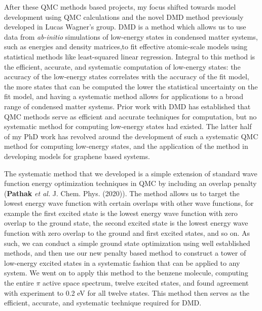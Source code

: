 \documentclass{article}
\begin{document}
After these QMC methods based projects, my focus shifted towards model development using QMC calculations and the novel DMD method previously developed in Lucas Wagner's group.
DMD is a method which allows us to use data from \textit{ab-initio} simulations of low-energy states in condensed matter systems, such as energies and density matrices,to fit effective atomic-scale models using statistical methods like least-squared linear regression.
Integral to this method is the efficient, accurate, and systematic computation of low-energy states: the accuracy of the low-energy states correlates with the accuracy of the fit model,  the more states that can be computed the lower the statistical uncertainty on the fit model, and having a systematic method allows for applications to a broad range of condensed matter systems.
Prior work with DMD has established that QMC methods serve as efficient and accurate techniques for computation, but no systematic method for computing low-energy states had existed.
The latter half of my PhD work has revolved around the development of such a systematic QMC method for computing low-energy states, and the application of the method in developing models for graphene based systems.

The systematic method that we developed is a simple extension of standard wave function energy optimization techniques in QMC by including an overlap penalty (\textbf{Pathak} \textit{et al.} J. Chem. Phys. (2020)).
The method allows us to target the lowest energy wave function with certain overlaps with other wave functions, for example the first excited state is the lowest energy wave function with zero overlap to the ground state, the second excited state is the lowest energy wave function with zero overlap to the ground and first excited states, and so on.
As such, we can conduct a simple ground state optimization using well established methods, and then use our new penalty based method to construct a tower of low-energy excited states in a systematic fashion that can be applied to any system.
We went on to apply this method to the benzene molecule, computing the entire $\pi$ active space spectrum, twelve excited states, and found agreement with experiment to 0.2 eV for all twelve states.
This method then serves as the efficient, accurate, and systematic technique required for DMD.
\end{document}
